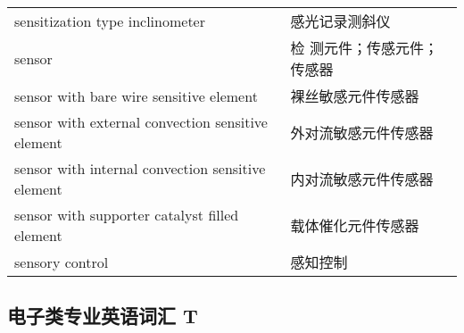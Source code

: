 \documentclass[
]{article}
\begin{document}
\begin{longtable}[]{@{}ll@{}}
sensitization type inclinometer & 感光记录测斜仪 \\
sensor & 检 测元件；传感元件；传感器 \\
sensor with bare wire sensitive element & 裸丝敏感元件传感器 \\
sensor with external convection sensitive element &
外对流敏感元件传感器 \\
sensor with internal convection sensitive element &
内对流敏感元件传感器 \\
sensor with supporter catalyst filled element & 载体催化元件传感器 \\
sensory control & 感知控制 \\
\bottomrule()
\end{longtable}

\hypertarget{ux7535ux5b50ux7c7bux4e13ux4e1aux82f1ux8bedux8bcdux6c47-t}{%
\subsection{\texorpdfstring{电子类专业英语词汇 T
}{电子类专业英语词汇 T }}\label{ux7535ux5b50ux7c7bux4e13ux4e1aux82f1ux8bedux8bcdux6c47-t}}
\end{document}
